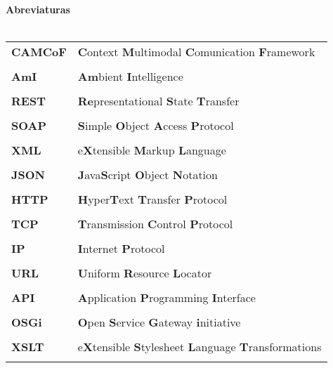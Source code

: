 \documentclass[a4paper, 12pt, oneside]{Thesis}  %
\begin{document}
\clearpage  %

{\centering \LARGE
{\LARGE\bf \textbf{Abreviaturas} } }\\\\


\begin{table}[!h]
\begin{tabular}{ll} 
	\textbf{CAMCoF}	& \textbf{C}ontext \textbf{M}ultimodal  \textbf{C}omunication \textbf{F}ramework	 \\ \\
	\textbf{AmI}	& \textbf{Am}bient \textbf{I}ntelligence	 \\ \\
	\textbf{REST}	& \textbf{Re}presentational \textbf{S}tate \textbf{T}ransfer	 \\ \\
	\textbf{SOAP}	& \textbf{S}imple \textbf{O}bject  \textbf{A}ccess \textbf{P}rotocol	 \\ \\
	\textbf{XML}	& e\textbf{X}tensible \textbf{M}arkup  \textbf{L}anguage	 \\ \\
	\textbf{JSON}	& \textbf{J}ava\textbf{S}cript  \textbf{O}bject \textbf{N}otation	 \\ \\
	\textbf{HTTP}	& \textbf{H}yper\textbf{T}ext  \textbf{T}ransfer \textbf{P}rotocol	 \\ \\
	\textbf{TCP}	& \textbf{T}ransmission \textbf{C}ontrol  \textbf{P}rotocol	 \\ \\
	\textbf{IP}	& \textbf{I}nternet \textbf{P}rotocol	 \\ \\
	\textbf{URL}	& \textbf{U}niform \textbf{R}esource  \textbf{L}ocator	 \\ \\
	\textbf{API}	& \textbf{A}pplication \textbf{P}rogramming  \textbf{I}nterface  \\ \\
	\textbf{OSGi}	& \textbf{O}pen \textbf{S}ervice  \textbf{G}ateway \textbf{i}nitiative	 \\ \\
	\textbf{XSLT}	& e\textbf{X}tensible \textbf{S}tylesheet  \textbf{L}anguage \textbf{T}ransformations	 \\ \\

\end{tabular}
\end{table}
\end{document}
